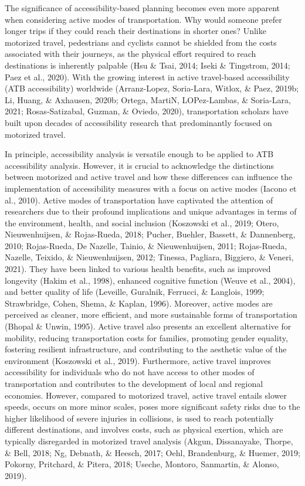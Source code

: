 \documentclass[12pt,twoside]{reedthesis}
\begin{document}
The significance of accessibility-based planning becomes even more apparent when considering active modes of transportation. Why would someone prefer longer trips if they could reach their destinations in shorter ones? Unlike motorized travel, pedestrians and cyclists cannot be shielded from the costs associated with their journeys, as the physical effort required to reach destinations is inherently palpable (Hsu \& Tsai, 2014; Iseki \& Tingstrom, 2014; Paez et al., 2020). With the growing interest in active travel-based accessibility (ATB accessibility) worldwide (Arranz-Lopez, Soria-Lara, Witlox, \& Paez, 2019b; Li, Huang, \& Axhausen, 2020b; Ortega, MartiN, LOPez-Lambas, \& Soria-Lara, 2021; Rosas-Satizabal, Guzman, \& Oviedo, 2020), transportation scholars have built upon decades of accessibility research that predominantly focused on motorized travel.

In principle, accessibility analysis is versatile enough to be applied to ATB accessibility analysis. However, it is crucial to acknowledge the distinctions between motorized and active travel and how these differences can influence the implementation of accessibility measures with a focus on active modes (Iacono et al., 2010). Active modes of transportation have captivated the attention of researchers due to their profound implications and unique advantages in terms of the environment, health, and social inclusion (Koszowski et al., 2019; Otero, Nieuwenhuijsen, \& Rojas-Rueda, 2018; Pucher, Buehler, Bassett, \& Dannenberg, 2010; Rojas-Rueda, De Nazelle, Tainio, \& Nieuwenhuijsen, 2011; Rojas-Rueda, Nazelle, Teixido, \& Nieuwenhuijsen, 2012; Tinessa, Pagliara, Biggiero, \& Veneri, 2021). They have been linked to various health benefits, such as improved longevity (Hakim et al., 1998), enhanced cognitive function (Weuve et al., 2004), and better quality of life (Leveille, Guralnik, Ferrucci, \& Langlois, 1999; Strawbridge, Cohen, Shema, \& Kaplan, 1996). Moreover, active modes are perceived as cleaner, more efficient, and more sustainable forms of transportation (Bhopal \& Unwin, 1995). Active travel also presents an excellent alternative for mobility, reducing transportation costs for families, promoting gender equality, fostering resilient infrastructure, and contributing to the aesthetic value of the environment (Koszowski et al., 2019). Furthermore, active travel improves accessibility for individuals who do not have access to other modes of transportation and contributes to the development of local and regional economies. However, compared to motorized travel, active travel entails slower speeds, occurs on more minor scales, poses more significant safety risks due to the higher likelihood of severe injuries in collisions, is used to reach potentially different destinations, and involves costs, such as physical exertion, which are typically disregarded in motorized travel analysis (Akgun, Dissanayake, Thorpe, \& Bell, 2018; Ng, Debnath, \& Heesch, 2017; Oehl, Brandenburg, \& Huemer, 2019; Pokorny, Pritchard, \& Pitera, 2018; Useche, Montoro, Sanmartin, \& Alonso, 2019).
\end{document}
